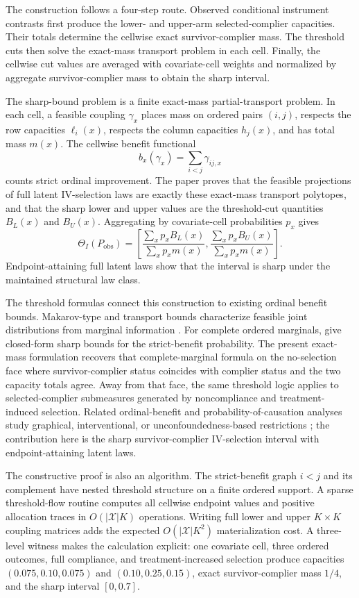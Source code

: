 \documentclass[11pt]{article}
\begin{document}
The construction follows a four-step route.  Observed conditional instrument contrasts first produce the lower- and upper-arm selected-complier capacities.  Their totals determine the cellwise exact survivor-complier mass.  The threshold cuts then solve the exact-mass transport problem in each cell.  Finally, the cellwise cut values are averaged with covariate-cell weights and normalized by aggregate survivor-complier mass to obtain the sharp interval.

The sharp-bound problem is a finite exact-mass partial-transport problem.  In each cell, a feasible coupling \(\gamma_x\) places mass on ordered pairs \((i,j)\), respects the row capacities \(\ell_i(x)\), respects the column capacities \(h_j(x)\), and has total mass \(m(x)\).  The cellwise benefit functional
\[
b_x(\gamma_x)=\sum_{i<j}\gamma_{ij,x}
\]
counts strict ordinal improvement.  The paper proves that the feasible projections of full latent IV-selection laws are exactly these exact-mass transport polytopes, and that the sharp lower and upper values are the threshold-cut quantities \(B_L(x)\) and \(B_U(x)\).  Aggregating by covariate-cell probabilities \(p_x\) gives
\[
\Theta_I(P_{\mathrm{obs}})
=
\left[
\frac{\sum_x p_x B_L(x)}{\sum_x p_x m(x)},
\frac{\sum_x p_x B_U(x)}{\sum_x p_x m(x)}
\right].
\]
Endpoint-attaining full latent laws show that the interval is sharp under the maintained structural law class.

The threshold formulas connect this construction to existing ordinal benefit bounds.  Makarov-type and transport bounds characterize feasible joint distributions from marginal information \citep{Makarov1982,WilliamsonDowns1990,FanPark2010,Villani2009}.  For complete ordered marginals, \citet{LuDingDasgupta2018} give closed-form sharp bounds for the strict-benefit probability.  The present exact-mass formulation recovers that complete-marginal formula on the no-selection face where survivor-complier status coincides with complier status and the two capacity totals agree.  Away from that face, the same threshold logic applies to selected-complier submeasures generated by noncompliance and treatment-induced selection.  Related ordinal-benefit and probability-of-causation analyses study graphical, interventional, or unconfoundedness-based restrictions \citep{TianPearl2000,SachsEtAl2023,DuarteEtAl2023,GabrielSachsJensen2024,deAguasEtAl2025,ChenLi2026}; the contribution here is the sharp survivor-complier IV-selection interval with endpoint-attaining latent laws.

The constructive proof is also an algorithm.  The strict-benefit graph \(i<j\) and its complement have nested threshold structure on a finite ordered support.  A sparse threshold-flow routine computes all cellwise endpoint values and positive allocation traces in \(O(|\mathcal X|K)\) operations.  Writing full lower and upper \(K\times K\) coupling matrices adds the expected \(O(|\mathcal X|K^2)\) materialization cost.  A three-level witness makes the calculation explicit: one covariate cell, three ordered outcomes, full compliance, and treatment-increased selection produce capacities \((0.075,0.10,0.075)\) and \((0.10,0.25,0.15)\), exact survivor-complier mass \(1/4\), and the sharp interval \([0,0.7]\).
\end{document}
